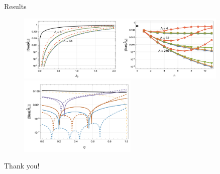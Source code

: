 \documentclass[11pt,aspectratio=1610,xcolor=dvipsnames]{beamer}
\begin{document}
\begin{frame}{Results}
	\begin{figure}[h]
		\centering
		\includegraphics[width=0.9\textwidth]{results.png}
		\includegraphics[width=0.5\textwidth]{markovianity.png}
	\end{figure}
\end{frame}

\begin{frame}[standout]
	Thank you!
\end{frame}
\end{document}
